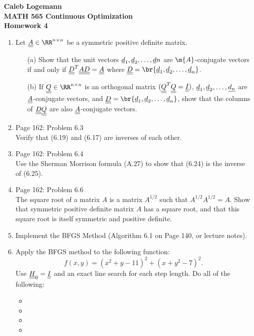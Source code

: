 \documentclass[11pt, oneside]{article}
\begin{document}
\noindent \textbf{\Large{Caleb Logemann \\
MATH 565 Continuous Optimization \\
Homework 4
}}

%
\begin{enumerate}
  \item %
    Let $\M{A} \in \RR^{n \times n}$ be a symmetric positive definite matrix.
    \begin{enumerate}
      \item[(a)]
        Show that the unit vectors $\underline{d}_1, \underline{d}_2, \ldots, \underline{d}n$ are
        $\m{A}$-conjugate vectors if and only if $\underline{\underline{D}}^T \underline{\underline{A}} \underline{\underline{D}} = \underline{\underline{A}}$
        where $\M{D} = \br{\v{d}_1, \v{d}_2, \ldots, \v{d}_n}$.

      \item[(b)]
        If $\M{Q} \in \RR^{n \times n}$ is an orthogonal matrix
        $(\underline{\underline{Q}}^T \underline{\underline{Q}} = \underline{\underline{I}})$, $\underline{d}_1, \underline{d}_2, \ldots, \underline{d_n}$ are
        $\underline{\underline{A}}$-conjugate vectors, and
        $\M{D} = \br{\v{d}_1, \v{d}_2, \ldots, \v{d}_n}$, show that the columns
        of $\underline{\underline{D}} \underline{\underline{Q}}$ are also $\underline{\underline{A}}$-conjugate vectors.
    \end{enumerate}

  \item %
    Page 162: Problem 6.3 \\
    Verify that (6.19) and (6.17) are inverses of each other.

  \item %
    Page 162: Problem 6.4 \\
    Use the Sherman Morrison formula (A.27) to show that (6.24) is the inverse
    of (6.25).

  \item %
    Page 162: Problem 6.6 \\
    The square root of a matrix $A$ is a matrix $A^{1/2}$ such that
    $A^{1/2} A^{1/2} = A$.
    Show that symmetric positive definite matrix $A$ has a square root, and that
    this square root is itself symmetric and positive definite.

  \item %
    Implement the BFGS Method (Algorithm 6.1 on Page 140, or lecture notes).

  \item %
    Apply the BFGS method to the following function:
    \[
      f(x, y) = (x^2 + y - 11)^2 + (x + y^2 - 7)^2.
    \]
    Use $\underline{\underline{H}}_0 = \underline{\underline{I}}$ and an exact line search for each step length.
    Do all of the following:
    \begin{itemize}
      \item
      \item
      \item
      \item
    \end{itemize}
\end{enumerate}
\end{document}
